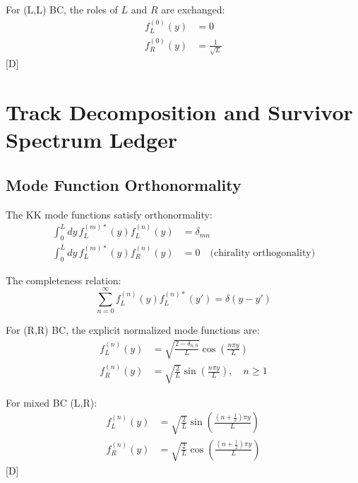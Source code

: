 \documentclass[11pt,a4paper]{article}
\newcommand{\tagD}{\textcolor{blue!70!black}{[D]}}
\begin{document}
For (L,L) BC, the roles of $L$ and $R$ are exchanged:
\begin{align}
\label{eq:zero-mode-LL-fL}
f_L^{(0)}(y) &= 0 \\
\label{eq:zero-mode-LL-fR}
f_R^{(0)}(y) &= \frac{1}{\sqrt{L}}
\end{align}
\tagD

\section{Track Decomposition and Survivor Spectrum Ledger}
\label{sec:survivors}

\subsection{Mode Function Orthonormality}

The KK mode functions satisfy orthonormality:
\begin{align}
\label{eq:ortho-same}
\int_0^L dy\, f_L^{(m)*}(y) f_L^{(n)}(y) &= \delta_{mn} \\
\label{eq:ortho-cross}
\int_0^L dy\, f_L^{(m)*}(y) f_R^{(n)}(y) &= 0 \quad \text{(chirality orthogonality)}
\end{align}

The completeness relation:
\begin{equation}
\label{eq:completeness}
\sum_{n=0}^\infty f_L^{(n)}(y) f_L^{(n)*}(y') = \delta(y - y')
\end{equation}

For (R,R) BC, the explicit normalized mode functions are:
\begin{align}
\label{eq:mode-RR-L}
f_L^{(n)}(y) &= \sqrt{\frac{2 - \delta_{n,0}}{L}} \cos\left(\frac{n\pi y}{L}\right) \\
\label{eq:mode-RR-R}
f_R^{(n)}(y) &= \sqrt{\frac{2}{L}} \sin\left(\frac{n\pi y}{L}\right), \quad n \geq 1
\end{align}

For mixed BC (L,R):
\begin{align}
\label{eq:mode-LR-L}
f_L^{(n)}(y) &= \sqrt{\frac{2}{L}} \sin\left(\frac{(n + \tfrac{1}{2})\pi y}{L}\right) \\
\label{eq:mode-LR-R}
f_R^{(n)}(y) &= \sqrt{\frac{2}{L}} \cos\left(\frac{(n + \tfrac{1}{2})\pi y}{L}\right)
\end{align}
\tagD
\end{document}
